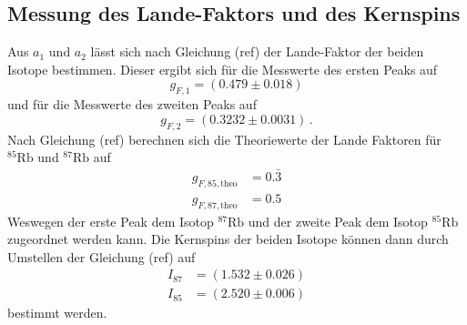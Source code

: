\subsection{Messung des Lande-Faktors und des Kernspins}
Aus $a_1$ und $a_2$ lässt sich nach Gleichung (ref) der Lande-Faktor der beiden Isotope bestimmen.
Dieser ergibt sich für die Messwerte des ersten Peaks auf 
\begin{equation}
  g_{F, 1} = \left(0.479 \pm 0.018 \right)
\end{equation} 
und für die Messwerte des zweiten Peaks auf
\begin{equation}
  g_{F, 2} = \left(0.3232 \pm 0.0031 \right) \, .
\end{equation}
Nach Gleichung (ref) berechnen sich die Theoriewerte der Lande Faktoren für ${}^{85}\text{Rb}$ und ${}^{87}\text{Rb}$ auf 
\begin{align*}
  g_{F, 85, \text{theo}} &= 0.\bar{3} \\
  g_{F, 87, \text{theo}} &= 0.5
\end{align*}
Weswegen der erste Peak dem Isotop ${}^{87}\text{Rb}$ und der zweite Peak dem Isotop ${}^{85}\text{Rb}$ zugeordnet werden kann.
Die Kernspins der beiden Isotope können dann durch Umstellen der Gleichung (ref) auf 
\begin{align*}
  I_{87} &= \left(1.532 \pm 0.026\right) \\
  I_{85} &= \left(2.520 \pm 0.006\right)
\end{align*}
bestimmt werden.

